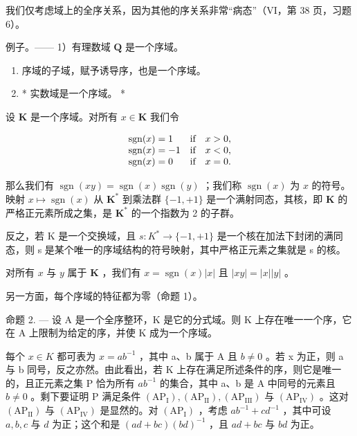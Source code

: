 我们仅考虑域上的全序关系，因为其他的序关系非常“病态”（VI，第 38 页，习题 6）。

例子。—— 1）有理数域 \(\mathbf{Q}\) 是一个序域。

\begin{enumerate}
\def\labelenumi{\arabic{enumi})}
\setcounter{enumi}{1}
\item
  序域的子域，赋予诱导序，也是一个序域。
\item
  * 实数域是一个序域。 *
\end{enumerate}

设 \(\mathbf{K}\) 是一个序域。对所有 \(x\in \mathbf{K}\) 我们令

\[
\begin{array}{l l} \operatorname{sgn} (x) = 1 & \text {if} \quad x > 0, \\ \operatorname{sgn} (x) = - 1 & \text {if} \quad x <   0, \\ \operatorname{sgn} (x) = 0 & \text {if} \quad x = 0. \end{array}
\]

那么我们有 \(\operatorname{sgn}(xy) = \operatorname{sgn}(x)\operatorname{sgn}(y)\) ；我们称 \(\operatorname{sgn}(x)\) 为 \(x\) 的符号。映射 \(x \mapsto \operatorname{sgn}(x)\) 从 \(\mathbf{K}^*\) 到乘法群 \(\{-1, +1\}\) 是一个满射同态，其核，即 \(\mathbf{K}\) 的严格正元素所成之集，是 \(\mathbf{K}^*\) 的一个指数为 2 的子群。

反之，若 K 是一个交换域，且 \(s: K^{*} \to \{-1, +1\}\) 是一个核在加法下封闭的满同态，则 s 是某个唯一的序域结构的符号映射，其中严格正元素之集就是 s 的核。

对所有 \(x\) 与 \(y\) 属于 \(\mathbf{K}\) ，我们有 \(x = \operatorname{sgn}(x)|x|\) 且 \(|xy| = |x||y|\) 。

另一方面，每个序域的特征都为零（命题 1）。

命题 2. --- 设 A 是一个全序整环，K 是它的分式域。则 K 上存在唯一一个序，它在 A 上限制为给定的序，并使 K 成为一个序域。

每个 \(x \in K\) 都可表为 \(x = ab^{-1}\) ，其中 a、b 属于 A 且 \(b \neq 0\) 。若 x 为正，则 a 与 b 同号，反之亦然。由此看出，若 K 上存在满足所述条件的序，则它是唯一的，且正元素之集 P 恰为所有 \(ab^{-1}\) 的集合，其中 a、b 是 A 中同号的元素且 \(b \neq 0\) 。剩下要证明 P 满足条件 \((\mathrm{AP}_{\mathrm{I}}), (\mathrm{AP}_{\mathrm{II}}), (\mathrm{AP}_{\mathrm{III}})\) 与 \((\mathrm{AP}_{\mathrm{IV}})\) 。这对 \((\mathrm{AP}_{\mathrm{II}})\) 与 \((\mathrm{AP}_{\mathrm{IV}})\) 是显然的。对 \((\mathrm{AP}_{\mathrm{I}})\) ，考虑 \(ab^{-1} + cd^{-1}\) ，其中可设 \(a, b, c\) 与 \(d\) 为正；这个和是 \((ad + bc)(bd)^{-1}\) ，且 \(ad + bc\) 与 \(bd\) 为正。

